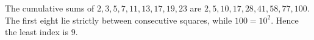 The cumulative sums of $2,3,5,7,11,13,17,19,23$ are $2,5,10,17,28,41,58,77,100$. The first eight lie strictly between consecutive squares, while $100=10^2$. Hence the least index is $\boxed9$.
